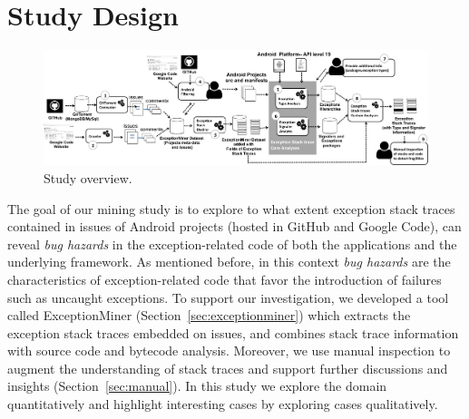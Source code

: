 \documentclass[conference]{IEEEtran}
\begin{document}
\section{Study Design}
\label{sec:study}

\begin{figure} 
\centering \includegraphics[width=.9\hsize]{overview_review.png}
\caption{Study overview.}\label{fig:overview} 
\end{figure}


The goal of our mining study is to explore to what extent exception stack traces 
contained in issues of Android projects (hosted in GitHub and Google Code), can reveal 
\emph{bug hazards} in the exception-related code of both the applications and the underlying framework. 
As mentioned before, in this context \emph{bug hazards} are the characteristics of exception-related code 
that favor the introduction of failures such as uncaught exceptions. 
To support our investigation, we developed a tool called ExceptionMiner (Section~\ref{sec:exceptionminer})
which extracts the exception stack traces embedded on issues, 
and combines stack trace information with source code and bytecode 
analysis. Moreover, we use manual inspection to augment
 the understanding of stack traces and support further discussions and insights (Section~\ref{sec:manual}).
In this study we explore the domain quantitatively and highlight interesting cases by 
exploring cases qualitatively. 
\end{document}
